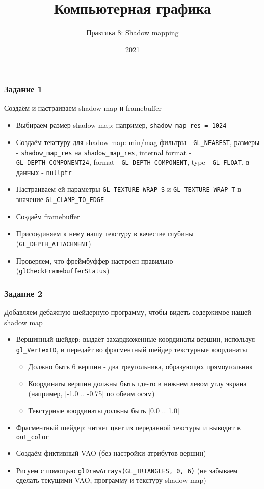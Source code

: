 \documentclass{beamer}
\title{Компьютерная графика}
\subtitle{Практика 8: Shadow mapping}
\date{2021}
\begin{document}
\frame{\titlepage}

\begin{frame}[fragile]
\frametitle{Задание 1}
\fontsize{10pt}{10pt}
Создаём и настраиваем shadow map и framebuffer
\begin{itemize}
\item Выбираем размер shadow map: например, \verb|shadow_map_res = 1024|
\pause
\item Создаём текстуру для shadow map: min/mag фильтры - \verb|GL_NEAREST|, размеры - \verb|shadow_map_res| на \verb|shadow_map_res|, internal format - \verb|GL_DEPTH_COMPONENT24|, format - \verb|GL_DEPTH_COMPONENT|, type - \verb|GL_FLOAT|, в данных - \verb|nullptr|
\item Настраиваем ей параметры \verb|GL_TEXTURE_WRAP_S| и \verb|GL_TEXTURE_WRAP_T| в значение \verb|GL_CLAMP_TO_EDGE|
\pause
\item Создаём framebuffer
\pause
\item Присоединяем к нему нашу текстуру в качестве глубины (\verb|GL_DEPTH_ATTACHMENT|)
\pause
\item Проверяем, что фреймбуффер настроен правильно (\verb|glCheckFramebufferStatus|)
\end{itemize}
\end{frame}

\begin{frame}[fragile]
\frametitle{Задание 2}
\fontsize{10pt}{10pt}
Добавляем дебажную шейдерную программу, чтобы видеть содержимое нашей shadow map
\begin{itemize}
\item Вершинный шейдер: выдаёт захардкоженные координаты вершин, используя \verb|gl_VertexID|, и передаёт во фрагментный шейдер текстурные координаты
\begin{itemize}
\item Должно быть 6 вершин - два треугольника, образующих прямоугольник
\item Координаты вершин должны быть где-то в нижнем левом углу экрана (например, [-1.0 .. -0.75] по обеим осям)
\item Текстурные координаты должны быть [0.0 .. 1.0]
\end{itemize}
\pause
\item Фрагментный шейдер: читает цвет из переданной текстуры и выводит в \verb|out_color|
\pause
\item Создаём фиктивный VAO (без настройки атрибутов вершин)
\pause
\item Рисуем с помощью \verb|glDrawArrays(GL_TRIANGLES, 0, 6)| (не забываем сделать текущими VAO, программу и текстуру shadow map)
\end{itemize}
\end{frame}
\end{document}
